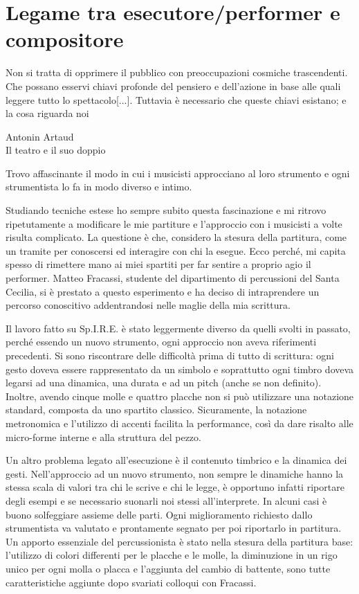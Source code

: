 
\section{Legame tra esecutore/performer e compositore}

\epigraph{Non si tratta di opprimere il pubblico con preoccupazioni cosmiche trascendenti. Che possano esservi chiavi profonde del pensiero e dell'azione in base alle quali leggere tutto lo spettacolo[...].
Tuttavia è necessario che queste chiavi esistano; e la cosa riguarda noi}{Antonin Artaud \\ Il teatro e il suo doppio}

Trovo affascinante il modo in cui i musicisti approcciano al loro strumento e ogni strumentista lo fa in modo diverso e intimo. 

Studiando tecniche estese ho sempre subito questa fascinazione e mi ritrovo ripetutamente a modificare le mie partiture e l'approccio con i musicisti a volte risulta complicato. La questione è che, considero la stesura della partitura, come un tramite per conoscersi ed interagire con chi la esegue. Ecco perché, mi capita spesso di rimettere mano ai miei spartiti per far sentire a proprio agio il performer. Matteo Fracassi, studente del dipartimento di percussioni del Santa Cecilia, si è prestato a questo esperimento e ha deciso di intraprendere un percorso conoscitivo addentrandosi nelle maglie della mia scrittura.

Il lavoro fatto su Sp.I.R.E. è stato leggermente diverso da quelli svolti in passato, perché essendo un nuovo strumento, ogni approccio non aveva riferimenti precedenti. Si sono riscontrare delle difficoltà prima di tutto di scrittura: ogni gesto doveva essere rappresentato da un simbolo e soprattutto ogni timbro doveva legarsi ad una dinamica, una durata e ad un pitch (anche se non definito). Inoltre, avendo cinque molle e quattro placche non si può utilizzare una notazione standard, composta da uno spartito classico. Sicuramente, la notazione metronomica e l'utilizzo di accenti facilita la performance, così da dare risalto alle micro-forme interne e alla struttura del pezzo.

Un altro problema legato all'esecuzione è il contenuto timbrico e la dinamica dei gesti. Nell'approccio ad un nuovo strumento, non sempre le dinamiche hanno la stessa scala di valori tra chi le scrive e chi le legge, è opportuno infatti riportare degli esempi e se necessario suonarli noi stessi all'interprete. In alcuni casi è buono solfeggiare assieme delle parti. Ogni miglioramento richiesto dallo strumentista va valutato e prontamente segnato per poi riportarlo in partitura. Un apporto essenziale del percussionista è stato nella stesura della partitura base: l'utilizzo di colori differenti per le placche e le molle, la diminuzione in un rigo unico per ogni molla o placca e l'aggiunta del cambio di battente, sono tutte caratteristiche aggiunte dopo svariati colloqui con Fracassi. 

